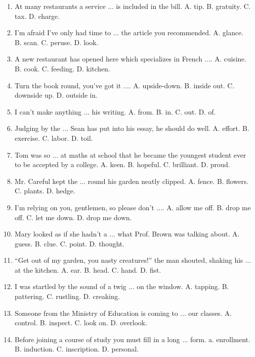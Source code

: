 \documentclass{article}
\numberwithin{equation}{section}
\begin{document}
\begin{enumerate}[leftmargin=8mm]
	\item At many restaurants a service $\ldots$ is included in the bill. {\sf A.} tip. {\sf B.} gratuity. {\sf C.} tax. {\sf D.} charge.
	\item I'm afraid I've only had time to $\ldots$ the article you recommended. {\sf A.} glance. {\sf B.} scan. {\sf C.} peruse. {\sf D.} look.
	\item A new restaurant has opened here which specializes in French $\ldots$. {\sf A.} cuisine. {\sf B.} cook. {\sf C.} feeding. {\sf D.} kitchen.
	\item Turn the book round, you've got it $\ldots$. {\sf A.} upside-down. {\sf B.} inside out. {\sf C.} downside up. {\sf D.} outside in.
	\item I can't make anything $\ldots$ his writing. {\sf A.} from. {\sf B.} in. {\sf C.} out. {\sf D.} of.
	\item Judging by the $\ldots$ Sean has put into his essay, he should do well. {\sf A.} effort. {\sf B.} exercise. {\sf C.} labor. {\sf D.} toil.
	\item Tom was so $\ldots$ at maths at school that he became the youngest student ever to be accepted by a college. {\sf A.} keen. {\sf B.} hopeful. {\sf C.} brilliant. {\sf D.} proud.
	\item Mr. Careful kept the $\ldots$ round his garden neatly clipped. {\sf A.} fence. {\sf B.} flowers. {\sf C.} plants. {\sf D.} hedge.
	\item I'm relying on you, gentlemen, so please don't $\ldots$. {\sf A.} allow me off. {\sf B.} drop me off. {\sf C.} let me down. {\sf D.} drop me down.
	\item Mary looked as if she hadn't a $\ldots$ what Prof. Brown was talking about. {\sf A.} guess. {\sf B.} clue. {\sf C.} point. {\sf D.} thought.
	\item ``Get out of my garden, you nasty creatures!'' the man shouted, shaking his $\ldots$ at the kitchen. {\sf A.} ear. {\sf B.} head. {\sf C.} hand. {\sf D.} fist.
	\item I was startled by the sound of a twig $\ldots$ on the window. {\sf A.} tapping. {\sf B.} pattering. {\sf C.} rustling. {\sf D.} creaking.
	\item Someone from the Ministry of Education is coming to $\ldots$ our classes. {\sf A.} control. {\sf B.} inspect. {\sf C.} look on. {\sf D.} overlook.
	\item Before joining a course of study you must fill in a long $\ldots$ form. a. enrollment. {\sf B.} induction. {\sf C.} inscription. {\sf D.} personal.

\end{enumerate}
\end{document}
